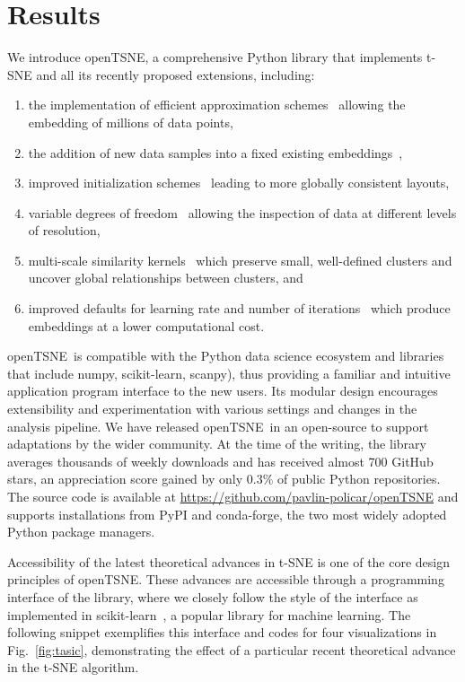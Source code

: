 \documentclass[twocolumn]{article}
\newcommand{\opentsne}{\textsf{openTSNE}}
\begin{document}
\section*{Results}

We introduce \opentsne, a comprehensive Python library that implements t-SNE
and all its recently proposed extensions, including:
\begin{enumerate}
\item the implementation of efficient approximation 
	schemes~\cite{van2014accelerating,linderman2019fast} allowing the embedding
	of millions of data points,
\item the addition of new data samples into a fixed existing
	embeddings~\cite{policar2019embedding},
\item improved initialization schemes~\cite{kobak2019umap} leading to more
	globally consistent layouts,
\item variable degrees of freedom~\cite{kobak2019heavy} allowing the inspection
	of data at different levels of resolution,
\item multi-scale similarity kernels~\cite{kobak2019art} which preserve small,
	well-defined clusters and uncover global relationships between clusters,
	and
\item improved defaults for learning rate and number of
	iterations~\cite{belkina2019automated} which produce embeddings at a lower
	computational cost.
\end{enumerate}

\opentsne\ is compatible with the Python data science ecosystem and
libraries that include \textsf{numpy}, \textsf{scikit-learn}, \textsf{scanpy}),
thus providing a familiar and intuitive application program interface to the new
users. Its modular design encourages extensibility and experimentation with
various settings and changes in the analysis pipeline.  We have released
\opentsne\ in an open-source to support adaptations by the wider community. At
the time of the writing, the library averages thousands of weekly
downloads and has received almost 700 GitHub stars, an appreciation score gained
by only $0.3\%$ of public Python repositories. The source code is available at
\url{https://github.com/pavlin-policar/openTSNE} and supports installations from
\textsf{PyPI} and \textsf{conda-forge}, the two most widely adopted Python
package managers.

Accessibility of the latest theoretical advances in t-SNE is one of the core
design principles of \opentsne. These advances are accessible through a
programming interface of the library, where we closely follow the style of the
interface as implemented in \textsf{scikit-learn}~\cite{sklearn_api}, a popular
library for machine learning. The following snippet exemplifies this interface
and codes for four visualizations in Fig.~\ref{fig:tasic}, demonstrating the
effect of a particular recent theoretical advance in the t-SNE algorithm. 
\end{document}

